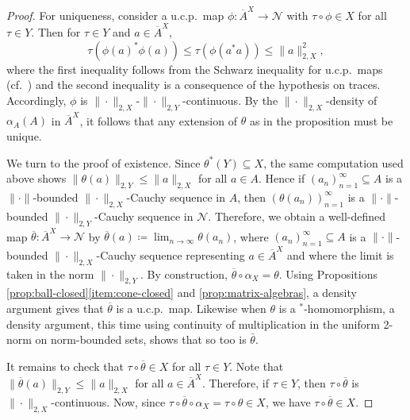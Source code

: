 \documentclass[a4paper,11pt]{amsart}
\theoremstyle{definition}
\numberwithin{equation}{section}
\numberwithin{theorem}{section}
\newcommand{\completion}[2]{\overline{#1}^{#2}}
\begin{document}
\begin{proof}
	For uniqueness, consider a u.c.p.\ map $\phi\colon \completion{A}{X}\to\mathcal N$ with $\tau\circ\phi\in X$ for all $\tau\in Y$.  Then for $\tau \in Y$ and $a \in \completion{A}{X}$,
   \begin{equation}\label{eq:trace-norm-contractive}
		\tau(\phi(a)^*\phi(a)) \leq \tau(\phi(a^*a)) \leq \|a\|_{2, X}^2,
	\end{equation}
 where the first inequality follows from the Schwarz inequality for u.c.p.\ maps (cf.\ \cite[Proposition 3.3]{Paulsen-cp-maps}) and the second inequality is a consequence of the hypothesis on traces. Accordingly, 
 $\phi$ is $\|\cdot\|_{2,X}$-$\|\cdot\|_{2,Y}$-continuous.  By the $\|\cdot\|_{2,X}$-density of $\alpha_A(A)$ in $\completion{A}{X}$, it follows that any extension of $\theta$ as in the proposition must be unique.
 
 








	
	We turn to the proof of existence.  Since $\theta^*(Y) \subseteq X$, the same computation used above shows $\|\theta(a)\|_{2, Y} \leq \|a\|_{2, X}$ for all $a \in A$.  Hence if $(a_n)_{n=1}^\infty \subseteq A$ is a $\|\cdot\|$-bounded $\|\cdot\|_{2, X}$-Cauchy sequence in $A$, then $(\theta(a_n))_{n=1}^\infty$ is a $\|\cdot\|$-bounded $\|\cdot\|_{2, Y}$-Cauchy sequence in $\mathcal N$.  Therefore, we obtain a well-defined map $\overline{\theta} \colon \completion{A}{X} \rightarrow \mathcal N$ by $\overline{\theta}(a) \coloneqq \lim_{n \rightarrow \infty} \theta(a_n)$, where $(a_n)_{n=1}^\infty \subseteq A$ is a $\|\cdot\|$-bounded $\|\cdot\|_{2, X}$-Cauchy sequence representing $a \in \completion{A}{X}$ and where the limit is taken in the norm $\|\cdot\|_{2, Y}$. By construction,  $\overline{\theta} \circ \alpha_X = \theta$. Using Propositions \ref{prop:ball-closed}\ref{item:cone-closed} and \ref{prop:matrix-algebras}, a density argument gives that $\overline{\theta}$ is a u.c.p.\ map.    Likewise when $\theta$ is a $^*$-homomorphism, a density argument, this time using continuity of multiplication in the uniform 2-norm on norm-bounded sets, shows that so too is $\bar{\theta}$.
	
	It remains to check that $\tau \circ \overline{\theta} \in X$ for all $\tau \in Y$.  Note that $\|\overline{\theta}(a)\|_{2, Y} \leq \|a\|_{2, X}$ for all $a \in \completion{A}{X}$.  Therefore, if $\tau \in Y$, then $\tau \circ \overline{\theta}$ is $\|\cdot\|_{2, X}$-continuous.  Now, since $\tau \circ \overline{\theta} \circ \alpha_X = \tau \circ \theta \in X$, we have $\tau \circ \overline{\theta} \in X$.
\end{proof}
\end{document}
